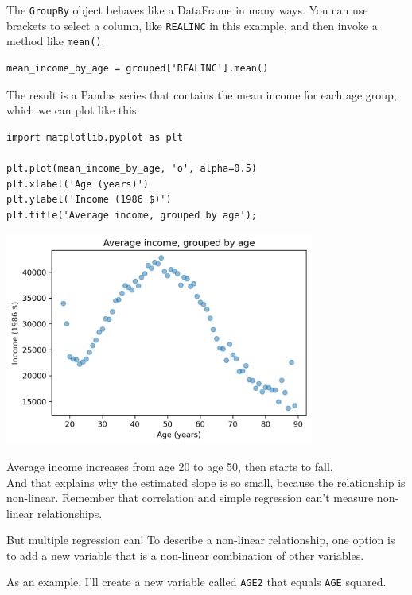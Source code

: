 The \passthrough{\lstinline!GroupBy!} object behaves like a DataFrame in
many ways. You can use brackets to select a column, like
\passthrough{\lstinline!REALINC!} in this example, and then invoke a
method like \passthrough{\lstinline!mean()!}.

\begin{lstlisting}[]
mean_income_by_age = grouped['REALINC'].mean()
\end{lstlisting}

The result is a Pandas series that contains the mean income for each age
group, which we can plot like this.

\begin{lstlisting}[]
import matplotlib.pyplot as plt

plt.plot(mean_income_by_age, 'o', alpha=0.5)
plt.xlabel('Age (years)')
plt.ylabel('Income (1986 $)')
plt.title('Average income, grouped by age');
\end{lstlisting}

\begin{center}
\includegraphics[width=4in]{chapters/10_regression_files/10_regression_36_0.png}
\end{center}

Average income increases from age 20 to age 50, then starts to fall.\\
And that explains why the estimated slope is so small, because the
relationship is non-linear. Remember that correlation and simple
regression can't measure non-linear relationships.

But multiple regression can! To describe a non-linear relationship, one
option is to add a new variable that is a non-linear combination of
other variables.

As an example, I'll create a new variable called
\passthrough{\lstinline!AGE2!} that equals \passthrough{\lstinline!AGE!}
squared.

